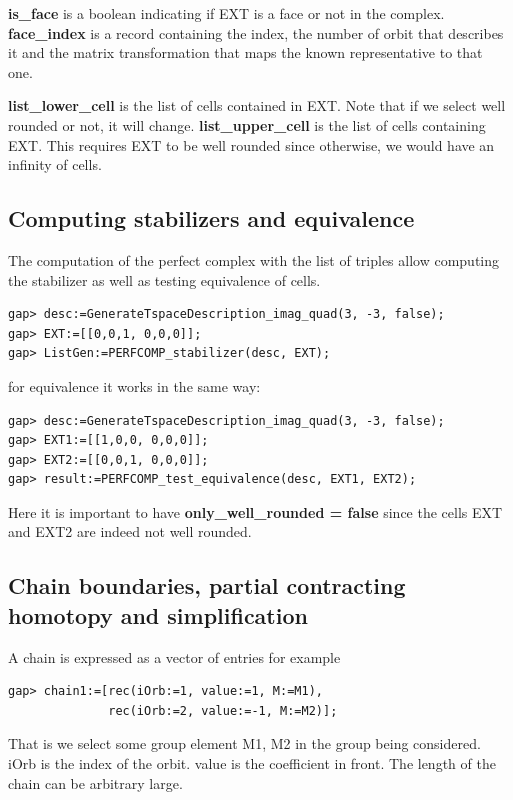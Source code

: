\documentclass[12pt]{amsart}
\begin{document}
{\bf is\_face} is a boolean indicating if EXT is a face or not in the complex.
{\bf face\_index} is a record containing the index, the number of orbit that describes it and the matrix transformation that maps the known representative to that one.

{\bf list\_lower\_cell} is the list of cells contained in EXT. Note that if we select well rounded or not, it will change.
{\bf list\_upper\_cell} is the list of cells containing EXT. This requires EXT to be well rounded since otherwise, we would have an infinity of cells.


\subsection{Computing stabilizers and equivalence}

The computation of the perfect complex with the list of triples allow computing the stabilizer as well as testing equivalence of cells.


\begin{verbatim}
gap> desc:=GenerateTspaceDescription_imag_quad(3, -3, false);
gap> EXT:=[[0,0,1, 0,0,0]];
gap> ListGen:=PERFCOMP_stabilizer(desc, EXT);
\end{verbatim}

for equivalence it works in the same way:

\begin{verbatim}
gap> desc:=GenerateTspaceDescription_imag_quad(3, -3, false);
gap> EXT1:=[[1,0,0, 0,0,0]];
gap> EXT2:=[[0,0,1, 0,0,0]];
gap> result:=PERFCOMP_test_equivalence(desc, EXT1, EXT2);
\end{verbatim}

Here it is important to have {\bf only\_well\_rounded = false} since the cells EXT and EXT2 are indeed not well rounded.




\subsection{Chain boundaries, partial contracting homotopy and simplification}

A chain is expressed as a vector of entries for example

\begin{verbatim}
gap> chain1:=[rec(iOrb:=1, value:=1, M:=M1),
              rec(iOrb:=2, value:=-1, M:=M2)];
\end{verbatim}
That is we select some group element M1, M2 in the group being considered. iOrb is the index of the orbit. value is the coefficient in front.
The length of the chain can be arbitrary large.
\end{document}
